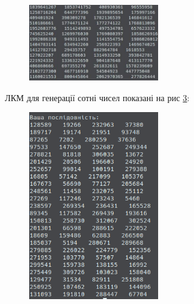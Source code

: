 \documentclass[oneside,final,14pt]{extreport}
\begin{document}
\begin{large}
\begin{figure}[H]
    \qquad
	\caption{}
	\label{p:92}
\end{figure}
\begin{figure}[H]
    \centering
	\includegraphics[width=0.5\textwidth]{6.jpg}
	\caption{}
	\label{p:93}
\end{figure}
\newpage
ЛКМ для генерації сотні чисел показані на рис \ref{p:94}:
\begin{figure}[H]
    \centering
	\includegraphics[width=0.5\textwidth]{2.png}
	\caption{}
	\label{p:94}
\end{figure}
\end{large}
\end{document}
